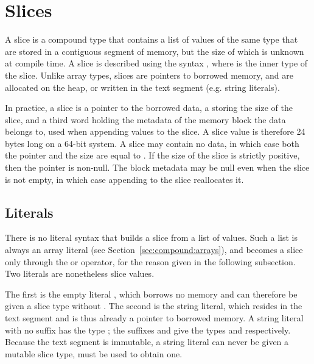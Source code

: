 \section{Slices}%
\label{sec:compound:slices}

A slice is a compound type that contains a list of values of the same type that
are stored in a contiguous segment of memory, but the size of which is unknown
at compile time. A slice is described using the syntax \token{[T]}, where
 is the inner type of the slice. Unlike array types, slices are
pointers to borrowed memory, and are allocated on the heap, or written in the
text segment (e.g. string literals).

In practice, a slice is a pointer  to the borrowed data, a
 storing the size of the slice, and a third word holding the
metadata of the memory block the data belongs to, used when appending values to
the slice. A slice value is therefore 24 bytes long on a 64-bit system. A slice
may contain no data, in which case both the pointer and the size are equal to
. If the size of the slice is strictly positive, then the pointer is
non-null. The block metadata may be null even when the slice is not empty, in
which case appending to the slice reallocates it.




\subsection{Literals}

There is no literal syntax that builds a slice from a list of values. Such a
list is always an array literal (see Section~\ref{sec:compound:arrays}), and becomes a
slice only through the  or  operator, for the reason
given in the following subsection. Two literals are nonetheless slice values.

The first is the empty literal \token{[]}, which borrows no memory and can
therefore be given a slice type without . The second is the string
literal, which resides in the text segment and is thus already a pointer to
borrowed memory. A string literal with no suffix has the type \token{[c8]}; the
suffixes  and  give the types \token{[c8]} and
\token{[c32]} respectively. Because the text segment is immutable, a string
literal can never be given a mutable slice type,  must be used to
obtain one.

